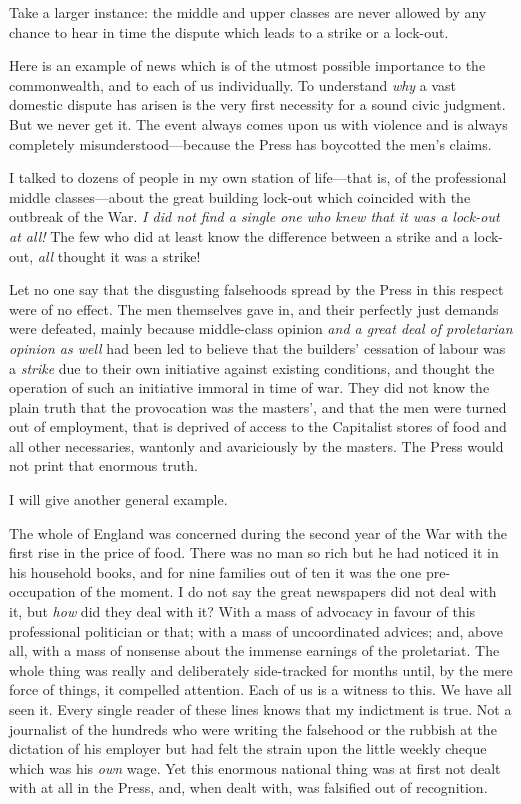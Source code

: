 \documentclass{book}
\begin{document}
Take a larger instance: the middle and upper classes are never allowed by any chance to hear in time the dispute which leads to a strike or a lock-out.

Here is an example of news which is of the utmost possible importance to the commonwealth, and to each of us individually. To understand \emph{why} a vast domestic dispute has arisen is the very first necessity for a sound civic judgment. But we never get it. The event always comes upon us with violence and is always completely misunderstood—because the Press has boycotted the men’s claims.

I talked to dozens of people in my own station of life—that is, of the professional middle classes—about the great building lock-out which coincided with the outbreak of the War. \emph{I did not find a single one who knew that it was a lock-out at all!} The few who did at least know the difference between a strike and a lock-out, \emph{all} thought it was a strike!

Let no one say that the disgusting falsehoods spread by the Press in this respect were of no effect. The men themselves gave in, and their perfectly just demands were defeated, mainly because middle-class opinion \emph{and a great deal of proletarian opinion as well} had been led to believe that the builders’ cessation of labour was a \emph{strike} due to their own initiative against existing conditions, and thought the operation of such an initiative immoral in time of war. They did not know the plain truth that the provocation was the masters’, and that the men were turned out of employment, that is deprived of access to the Capitalist stores of food and all other necessaries, wantonly and avariciously by the masters. The Press would not print that enormous truth.

I will give another general example.

The whole of England was concerned during the second year of the War with the first rise in the price of food. There was no man so rich but he had noticed it in his household books, and for nine families out of ten it was the one pre-occupation of the moment. I do not say the great newspapers did not deal with it, but \emph{how} did they deal with it? With a mass of advocacy in favour of this professional politician or that; with a mass of uncoordinated advices; and, above all, with a mass of nonsense about the immense earnings of the proletariat. The whole thing was really and deliberately side-tracked for months until, by the mere force of things, it compelled attention. Each of us is a witness to this. We have all seen it. Every single reader of these lines knows that my indictment is true. Not a journalist of the hundreds who were writing the falsehood or the rubbish at the dictation of his employer but had felt the strain upon the little weekly cheque which was his \emph{own} wage. Yet this enormous national thing was at first not dealt with at all in the Press, and, when dealt with, was falsified out of recognition.
\end{document}
